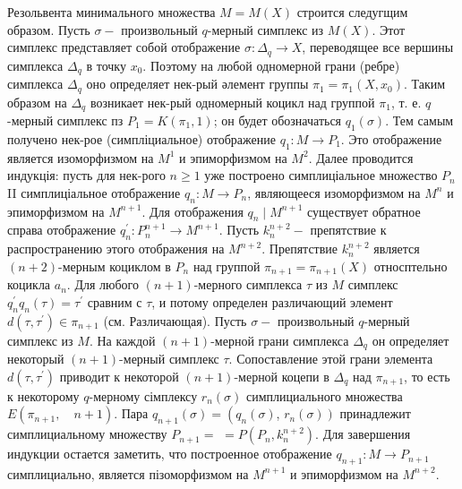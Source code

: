 \documentclass[10pt]{article}
\begin{document}
Резольвента минимального множества $M=M(X)$ строится следугщим образом. Пусть $\sigma-$ произвольный $q$-мерный симплекс из $M(X)$. Этот симплекс представляет собой отображение $\sigma: \Delta_{q} \rightarrow X$, переводящее все вершины симплекса $\Delta_{q}$ в точку $x_{0}$. Поэтому на любой одномерной грани (ребре) симплекса $\Delta_{q}$ оно определяет нек-рый әлемент группы $\pi_{1}=\pi_{1}\left(X, x_{0}\right)$. Таким образом на $\Delta_{q}$ возникает нек-рый одномерный коцикл над группой $\pi_{1}$, т. е. $q$-мерный симплекс пз $P_{1}=K\left(\pi_{1}, 1\right)$; он будет обозначаться $q_{1}(\sigma)$. Тем самым получено нек-рое (симпліциальное) отображение $q_{1}: M \rightarrow P_{1}$. Это отображение является изоморфизмом на $M^{1}$ и эпиморфизмом на $M^{2}$. Далее проводится индукція: пусть для нек-рого $n \geqslant 1$ уже построено симплиціальное множество $P_{n}$ II симплиціальное отображение $q_{n}: M \rightarrow P_{n}$, являющееся изоморфизмом на $M^{n}$ и эпиморфизмом на $M^{n+1}$. Для отображения $q_{n} \mid M^{n+1}$ существует обратное справа отображение $q_{n}^{\prime}: P_{n}^{n+1} \rightarrow M^{n+1}$. Пусть $k_{n}^{n+2}-$ препятствие к распространению этого отображения на $M^{n+2}$. Препятствие $k_{n}^{n+2}$ является $(n+2)$-мерным коциклом в $P_{n}$ над группой $\pi_{n+1}=\pi_{n+1}(X)$ относптельно коцикла $a_{n}$. Для любого $(n+1)$-мерного симплекса $\tau$ из $M$ симплекс $q_{n}^{\prime} q_{n}(\tau)=\tau^{\prime}$ сравним с $\tau$, и потому определен различающий элемент $d\left(\tau, \tau^{\prime}\right) \in \pi_{n+1}$ (см. Различающая). Пусть $\sigma-$ произвольный $q$-мерный симплекс из $M$. На каждой $(n+1)$-мерной грани симплекса $\Delta_{q}$ он определяет некоторый $(n+1)$-мерный симплекс $\tau$. Сопоставление этой грани элемента $d\left(\tau, \tau^{\prime}\right)$ приводит к некоторой $(n+1)$-мерной коцепи в $\Delta_{q}$ над $\pi_{n+1}$, то есть к некоторому $q$-мерному сімплексу $r_{n}(\sigma)$ симплициального множества $E\left(\pi_{n+1}, \quad n+1\right)$. Пара $q_{n+1}(\sigma)=\left(q_{n}(\sigma)\right.$, $\left.r_{n}(\sigma)\right)$ принадлежит симплициальному множеству $P_{n+1}=$ $=P\left(P_{n}, k_{n}^{n+2}\right)$. Для завершения индукции остается заметить, что построенное отображение $q_{n+1}: M \rightarrow P_{n+1}$ симплициально, является пізоморфизмом на $M^{n+1}$ и эпиморфизмом на $M^{n+2}$.
\end{document}
